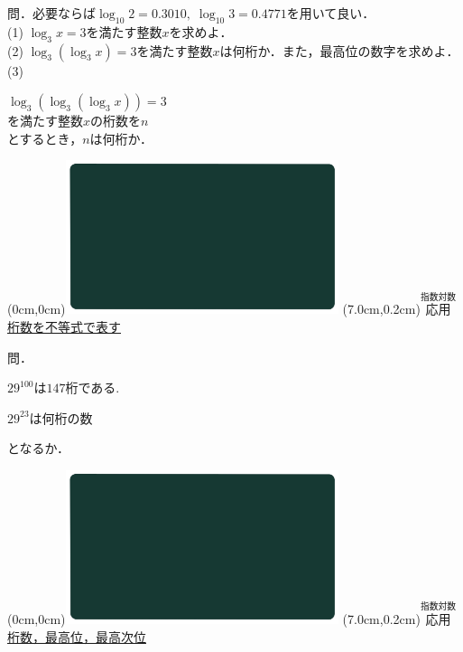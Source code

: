 \documentclass[10pt,
fleqn,
dvipdfmx,
uplatex
]{jsarticle}
\begin{document}
\tiny
問．必要ならば$\log _{10}2=0.{3010},\;\log _{10}3=0.{4771}$を用いて良い．\vspace{0.2zw}\\
(1)  $\log _3x=3$を満たす整数$x$を求めよ．\vspace{0.2zw}\\
(2)  $\log _3\left(\log _3x\right)=3$を満たす整数$x$は何桁か．また，最高位の数字を求めよ．\vspace{0.2zw}\\
(3)  

\LARGE
\vspace{-0.9zw}
\hspace{0.5zw}
$\log _3\left(\log _3\left(\log _3x\right)\right)=3$\vspace{-0.2zw}\\
を満たす整数$x$の桁数を$n$\vspace{-0.2zw}\\
\hfill とするとき，$n$は何桁か．




\newpage



\at(0cm,0cm){\includegraphics[width=8cm,bb=0 0 1920 1080]{./youtube/thumbnails/templates/smart_background/指数対数.jpeg}}
\at(7.0cm,0.2cm){\small\color{bradorange}$\overset{\text{指数対数}}{\text{応用}}$}
{\color{orange}\LARGE\underline{桁数を不等式で表す}}\vspace{0.3zw}

\normalsize
問．

\huge
\vspace{-0.8zw}
\hspace{0.3zw}
${29}^{100}$は${147}$桁である.

\HUGE
\vspace{-0.2zw}
\hspace{0.2zw}${29}^{23}$は何桁の数

\huge
\hfill となるか．

\newpage



\at(0cm,0cm){\includegraphics[width=8cm,bb=0 0 1920 1080]{./youtube/thumbnails/templates/smart_background/指数対数.jpeg}}
\at(7.0cm,0.2cm){\small\color{bradorange}$\overset{\text{指数対数}}{\text{応用}}$}
{\color{orange}\LARGE\underline{桁数，最高位，最高次位}}\vspace{0.3zw}
\end{document}
